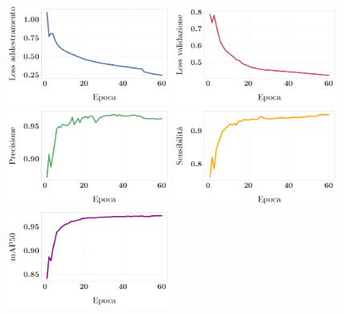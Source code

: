\documentclass[12pt]{report}
\begin{document}
\begin{figure}[h!]
	\centering
	{\includegraphics[width=0.48\textwidth]{images/domain-shift/sim-to-sim/1/train-loss}}
	\hspace{0.01\textwidth}
	{\includegraphics[width=0.48\textwidth]{images/domain-shift/sim-to-sim/1/validation-loss}}
	\hspace{0.01\textwidth}
	\\	
	{\includegraphics[width=0.48\textwidth]{images/domain-shift/sim-to-sim/1/precision}}
	\hspace{0.01\textwidth}
	{\includegraphics[width=0.48\textwidth]{images/domain-shift/sim-to-sim/1/recall}}
	\hspace{0.01\textwidth}
	\\
	{\includegraphics[width=0.48\textwidth]{images/domain-shift/sim-to-sim/1/map50}}

\end{figure}
\end{document}
